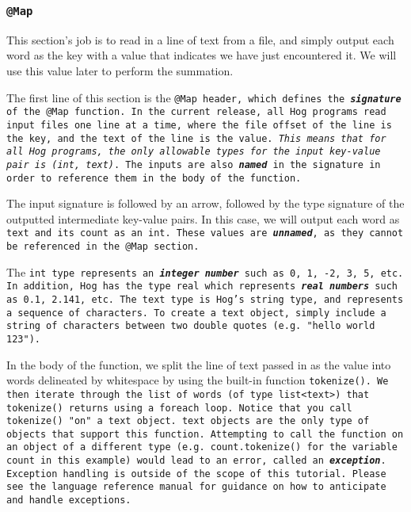 \documentclass{article} \usepackage{fancyhdr, multicol}
\begin{document}
\subsubsection*{\tt @Map \rm}

This section's job is to read in a line of text from a file, and simply output each
word as the key with a value that indicates we have just encountered it. We will
use this value later to perform the summation.

The first line of this section is the \tt @Map \rm header, which defines the
\textbf{\emph{signature}} of the \tt @Map \rm function. In the current release, all
Hog programs read input files one line at a time, where the file offset of the line
is the key, and the text of the line is the value. \emph{This means that for all
Hog programs, the only allowable types for the input key-value pair is \tt (int\rm,
\tt text)\rm}. The inputs are also \textbf{\emph{named}} in the signature in order
to reference them in the body of the function.

The input signature is followed by an arrow, followed by the type signature of the
outputted intermediate key-value pairs. In this case, we will output each word as
\tt text \rm and its count as an \tt int\rm. These values are
\textbf{\emph{unnamed}}, as they cannot be referenced in the \tt @Map \rm section.

The \tt int \rm type represents an \textbf{\emph{integer number}} such as 0, 1, -2,
3, 5, etc. In addition, Hog has the type \tt real \rm which represents
\textbf{\emph{real numbers}} such as 0.1, 2.141, etc. The \tt text \rm type is
Hog's string type, and represents a sequence of characters. To create a \tt text
\rm object, simply include a string of characters between two double quotes (e.g.
\tt "hello world 123"\rm).

In the body of the function, we split the line of text passed in as the value into
words delineated by whitespace by using the built-in function \tt tokenize()\rm. We
then iterate through the \tt list \rm of words (of type \tt list<text>\rm) that \tt
tokenize() \rm returns using a \tt foreach \rm loop. Notice that you call \tt
tokenize() \rm "on" a \tt text \rm object. \tt text \rm objects are the only type
of objects that support this function. Attempting to call the function on an object
of a different type (e.g. \tt count.tokenize() \rm for the variable \tt count \rm
in this example) would lead to an error, called an \textbf{\emph{exception}}.
Exception handling is outside of the scope of this tutorial. Please see the
language reference manual for guidance on how to anticipate and handle exceptions.
\end{document}
